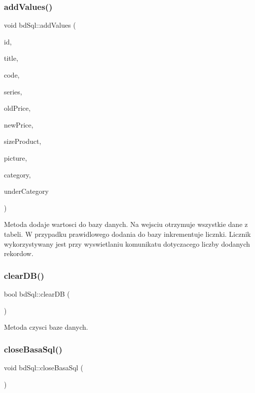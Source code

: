 \subsubsection{\texorpdfstring{add\+Values()}{addValues()}}
{\footnotesize\ttfamily void bd\+Sql\+::add\+Values (\begin{DoxyParamCaption}\item[{int}]{id,  }\item[{Q\+String}]{title,  }\item[{Q\+String}]{code,  }\item[{Q\+String}]{series,  }\item[{double}]{old\+Price,  }\item[{double}]{new\+Price,  }\item[{Q\+String}]{size\+Product,  }\item[{Q\+String}]{picture,  }\item[{Q\+String}]{category,  }\item[{Q\+String}]{under\+Category }\end{DoxyParamCaption})}

Metoda dodaje wartosci do bazy danych. Na wejsciu otrzymuje wszystkie dane z tabeli. W przypadku prawidlowego dodania do bazy inkrementuje licznki. Licznik wykorzystywany jest przy wyswietlaniu komunikatu dotyczacego liczby dodanych rekordow. \mbox{\label{classbd_sql_a86cd5eb2507cb591fdeed30506796681}} 
\subsubsection{\texorpdfstring{clear\+D\+B()}{clearDB()}}
{\footnotesize\ttfamily bool bd\+Sql\+::clear\+DB (\begin{DoxyParamCaption}{ }\end{DoxyParamCaption})}



Metoda czysci baze danych. 

\mbox{\label{classbd_sql_a0adf199bdaad8c61402b15e2a42578a2}} 
\subsubsection{\texorpdfstring{close\+Basa\+Sql()}{closeBasaSql()}}
{\footnotesize\ttfamily void bd\+Sql\+::close\+Basa\+Sql (\begin{DoxyParamCaption}{ }\end{DoxyParamCaption})}



